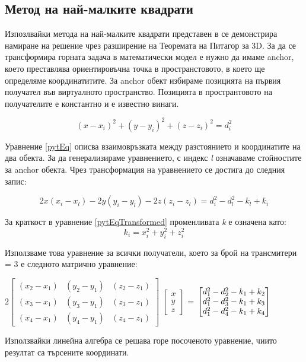 \subsection{Метод на най-малките квадрати} \label{squares_algorithm}

Изпозлвайки метода на най-малките квадрати представен в \cite{leastsq} се демонстрира намиране на решение чрез разширение на Теоремата на Питагор за 3D. За да се трансформира горната задача в математически модел е нужно да имаме anchor\cite{leastsq2}, което преставлява ориентировъчна точка в пространстовото, в което ще определяме координатитите. За anchor обект избираме позицията на първия получател във виртуалното пространство. Позицията в пространтовото на получателите е константно и е известно винаги.


\begin{equation} \label{pytEq}
   (x-x_i)^2 + (y-y_i)^2 + (z-z_i)^2=d_i^2
\end{equation}

Уравнение \ref{pytEq} описва взаимовръзката между разстоянието и координатите на два обекта. За да генерализираме уравнението, с индекс \textit{l} означаваме стойностите за anchor обекта. Чрез трансформация на уравнението се достига до следния запис:

\begin{equation} \label{pytEqTransformed}
  2 x (x_i - x_l) - 2 y (y_i - y_l) - 2  z  (z_i - z_l) = d^2_i - d^2_l - k_l + k_i
\end{equation}

За краткост в уравнение \ref{pytEqTransformed} променливата \textit{k} е означена като: 
\begin{equation} \label{kdesc}
    k_i= x^2_i + y^2_i + z^2_i
\end{equation}

Използваме това уравнение за всички получатели, което за брой на трансмитери = 3 е следното матрично уравнение:

\centerline{
    $
    2 \begin{bmatrix}
        (x_2-x_1) & (y_2 - y_1) & (z_2 - z_1)\\
        (x_3-x_1) & (y_3 - y_1) & (z_3 - z_1)\\
        (x_4-x_1) & (y_4 - y_1) & (z_4 - z_1)
    \end{bmatrix}
    $
    $
    \begin{bmatrix}
        x\\y\\z
    \end{bmatrix}
    $
    =
    $
    \begin{bmatrix}
        d^2_1 - d^2_2 - k_1 + k_2\\
        d^2_1 - d^2_3 - k_1 + k_3\\
        d^2_1 - d^2_4 - k_1 + k_4\\
    \end{bmatrix}\\
    $
}

Използвайки линейна алгебра се решава горе посоченото уравнение, чиито резултат са търсените координати.